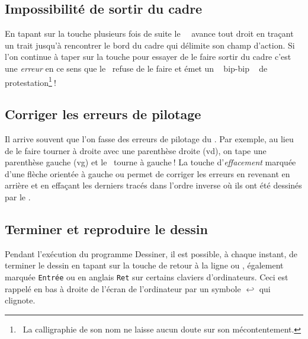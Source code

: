 \subsection{Impossibilité de sortir du cadre}

En tapant sur la touche   plusieurs fois de suite le \robot\ \robotCbN\ avance tout droit
en traçant un trait jusqu'à rencontrer le bord du cadre qui délimite son champ d'action.  
Si l'on continue à taper sur la touche
 pour essayer de le faire sortir du cadre c'est une {\em erreur} 
en ce sens que
le \robotErr\ refuse de le faire et émet un 
\raisebox{0.25ex}{$\scriptscriptstyle \boldmath\ll$}~%
bip-bip%
~\raisebox{0.25ex}{$\scriptscriptstyle \boldmath\gg$}
de 
protestation\@\footnote{\ La calligraphie de son nom
ne laisse aucun doute sur son mécontentement. 
}$\:$! 

\subsection{Corriger les erreurs de pilotage}

 Il arrive souvent que l'on fasse des erreurs de pilotage du \robotErr. Par
exemple, au lieu de le faire tourner à droite avec une 
parenthèse droite \touche{)} ({\idt vd}), on tape une parenthèse gauche 
\touche{(} ({\idt vg}) et le \robotErr\ tourne
à gauche$\:$! La touche d'{\em effacement} marquée d'une flèche 
orientée à gauche 
\hspace{0.3ex}\framebox[11.mm][l]{$\leftarrow$~~~}\hspace{0.3ex}
ou \hspace{0.3ex}\hspace{0.3ex}
permet de corriger les erreurs en revenant en arrière et en effaçant
les derniers tracés dans l'ordre inverse où ils ont été
dessinés par le \robot.

\subsection{Terminer et reproduire le dessin}

Pendant l'exécution du programme {\idt Des\-si\-ner}, 
il est possible,  à chaque ins\-tant, de
terminer le dessin en tapant sur la touche de retour à la ligne 
\hbox{\framebox[11.mm][l]{$\hookleftarrow$~~~}\hspace{0.3ex}} 
ou \hspace{0.3ex}\hspace{0.3ex}, également
marquée {\small\tt Entrée} ou en anglais {\small\tt Ret} sur certains  claviers d'ordinateurs. Ceci est rappelé 
en bas à droite de l'écran de l'ordinateur par un symbole 
$\hookleftarrow$ qui clignote. 

